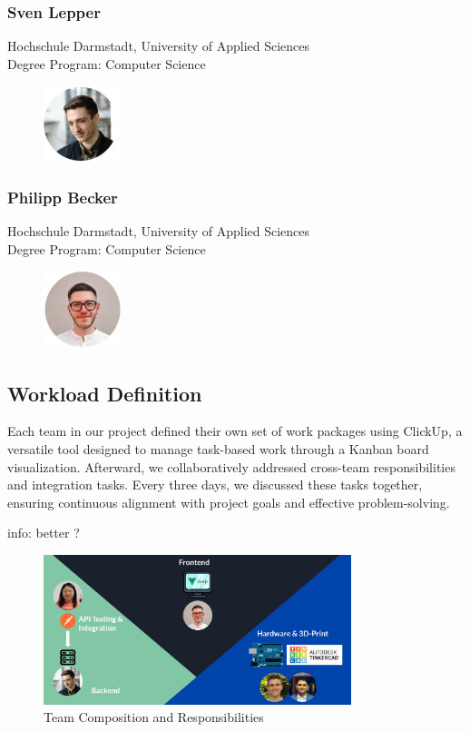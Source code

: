 \subsubsection{Sven Lepper}
Hochschule Darmstadt, University of Applied Sciences \\
Degree Program: Computer Science
\begin{figure}[h]
    \centering
    \includegraphics[width=0.2\textwidth]{images/sven.JPG}
\end{figure}

\subsubsection{Philipp Becker}
Hochschule Darmstadt, University of Applied Sciences \\
Degree Program: Computer Science
\begin{figure}[h]
    \centering
    \includegraphics[width=0.2\textwidth]{images/philipp.JPG}
\end{figure}
\newpage
\subsection{Workload Definition}

Each team in our project defined their own set of work packages using ClickUp, a versatile tool designed to manage task-based work through a Kanban board visualization. Afterward, we collaboratively addressed cross-team responsibilities and integration tasks. Every three days, we discussed these tasks together, ensuring continuous alignment with project goals and effective problem-solving.

info: better ?

\begin{figure}[h]
    \centering
    \includegraphics[width=0.8\textwidth]{images/workload.JPG}
    \caption{Team Composition and Responsibilities}
\end{figure}


